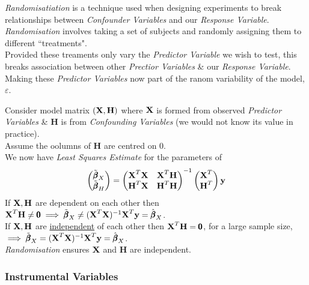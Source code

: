 \documentclass[11pt,a4paper]{article}
\begin{document}
\textit{Randomisatiation} is a technique used when designing experiments to break relationships between \textit{Confounder Variables} and our \textit{Response Variable}.\\
\textit{Randomisation} involves taking a set of subjects and randomly assigning them to different ``treatments".\\
Provided these treaments only vary the \textit{Predictor Variable} we wish to test, this breaks association between other \textit{Prectior Variables} \& our \textit{Response Variable}. Making these \textit{Predictor Variables} now part of the ranom variability of the model, $\varepsilon$.\\
 

Consider model matrix $(\textbf{X},\textbf{H})$ where $\textbf{X}$ is formed from observed \textit{Predictor Variables} \& $\textbf{H}$ is from \textit{Confounding Variables} (\nb we would not know its value in practice).\\
Assume the oolumns of $\textbf{H}$ are centred on 0.\\
We now have \textit{Least Squares Estimate} for the parameters of
$$\begin{pmatrix}\tilde{\pmb\beta}_X\\\tilde{\pmb\beta}_H\end{pmatrix}=\begin{pmatrix}\textbf{X}^T\textbf{X}&\textbf{X}^T\textbf{H}\\\textbf{H}^T\textbf{X}&\textbf{H}^T\textbf{H}\end{pmatrix}^{-1}\begin{pmatrix}\textbf{X}^T\\\textbf{H}^T\end{pmatrix}\textbf{y}$$
If $\textbf{X},\textbf{H}$ are dependent on each other then $\textbf{X}^T\textbf{H}\neq\pmb0\implies\tilde{\pmb\beta}_X\neq(\textbf{X}^T\textbf{X})^{-1}\textbf{X}^T\textbf{y}=\hat{\pmb\beta}_X$.\\
If $\textbf{X},\textbf{H}$ are \underline{independent} of each other then $\textbf{X}^T\textbf{H}=\pmb0$, for a large sample size,\\
$\implies\tilde{\pmb\beta}_X=(\textbf{X}^T\textbf{X})^{-1}\textbf{X}^T\textbf{y}=\hat{\pmb\beta}_X$.\\
\nb \textit{Randomisation} ensures $\textbf{X}$ and $\textbf{H}$ are independent.

\subsubsection{Instrumental Variables}
\end{document}
